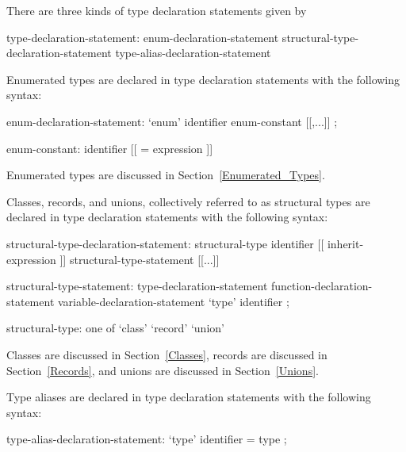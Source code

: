 There are three kinds of type declaration statements given by
\begin{syntax}
type-declaration-statement:
  enum-declaration-statement
  structural-type-declaration-statement
  type-alias-declaration-statement
\end{syntax}

Enumerated types are declared in type declaration statements with the
following syntax:
\begin{syntax}
enum-declaration-statement:
  `enum' identifier { enum-constant [[,...]] } ;

enum-constant:
  identifier [[ = expression ]]
\end{syntax}
Enumerated types are discussed in Section~\ref{Enumerated_Types}.

Classes, records, and unions, collectively referred to as structural
types are declared in type declaration statements with the following
syntax:
\begin{syntax}
structural-type-declaration-statement:
  structural-type identifier [[ inherit-expression ]] {
    structural-type-statement [[...]] }

structural-type-statement:
  type-declaration-statement
  function-declaration-statement
  variable-declaration-statement
  `type' identifier ;

structural-type: one of
  `class' `record' `union'
\end{syntax}
Classes are discussed in Section~\ref{Classes}, records are discussed
in Section~\ref{Records}, and unions are discussed in
Section~\ref{Unions}.

Type aliases are declared in type declaration statements with the
following syntax:
\begin{syntax}
type-alias-declaration-statement:
  `type' identifier = type ;
\end{syntax}
